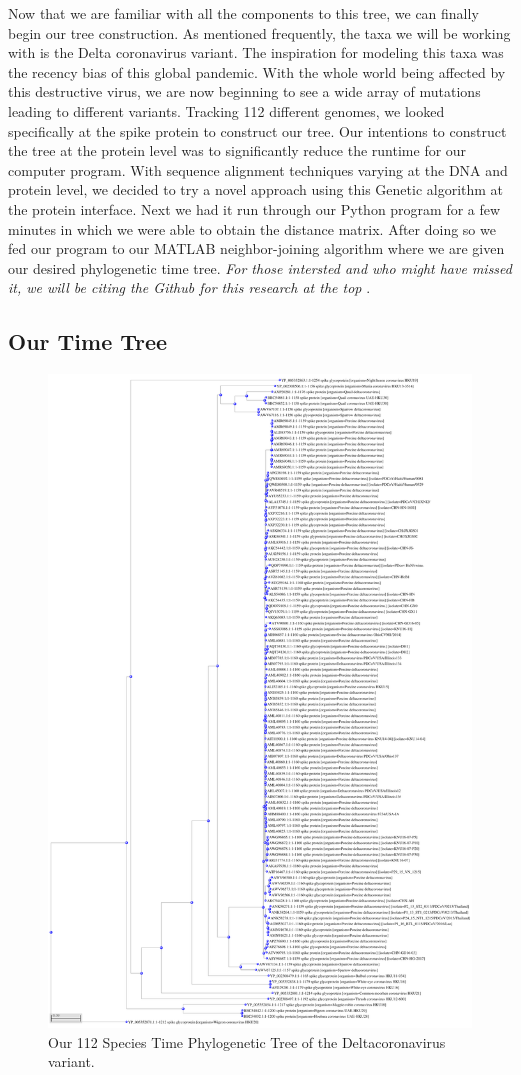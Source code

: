 Now that we are familiar with all the components to this tree, we can finally begin our tree construction. 
As mentioned frequently, the taxa we will be working with is the Delta coronavirus variant. 
The inspiration for modeling this taxa was the recency bias of this global pandemic.
With the whole world being affected by this destructive virus, we are now beginning to see a wide array of mutations leading to different variants.
Tracking 112 different genomes, we looked specifically at the spike protein to construct our tree. 
Our intentions to construct the tree at the protein level was to significantly reduce the runtime for our computer program. 
With sequence alignment techniques varying at the DNA and protein level, we decided to try a novel approach using this Genetic algorithm at the protein interface.
Next we had it run through our Python program for a few minutes in which we were able to obtain the distance matrix. 
After doing so we fed our program to our MATLAB neighbor-joining algorithm where we are given our desired phylogenetic time tree. \emph{For those intersted and who might have missed it, we will be citing the Github for this research at the top }. 

\subsection{Our Time Tree}

\begin{figure}[H]
\centering
\includegraphics[width=.8\textwidth]{figures/tree-expanded.pdf}
\caption{Our 112 Species Time Phylogenetic Tree of the Deltacoronavirus variant. }
\end{figure}

